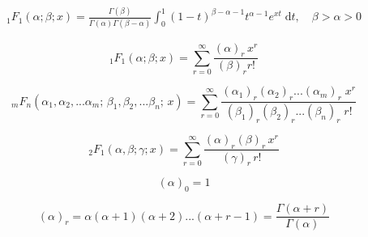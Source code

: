 \[\begin{align} \label{thrm9.7} {}_1F_1(\alpha ; \beta ; x) = \frac{\Gamma(\beta)}{\Gamma(\alpha)\Gamma(\beta-\alpha)}\int_0^1(1-t)^{\beta-\alpha-1}t^{\alpha-1}e^{xt}\; \mathrm dt,\quad \beta>\alpha>0 \end{align}\]

\[\begin{equation} \label{confhypergeo} _1F_1(\alpha;\beta;x) = \sum_{r=0}^\infty\frac{(\alpha)_r\,x^r}{(\beta)_rr!} \end{equation}\]

\[\begin{equation} \label{hypergeodef} _{m}F_{n}(\alpha_1,\alpha_2,...\alpha_m;\, \beta_1,\beta_2,...\beta_n;\, x)=\sum _{r=0}^\infty \frac {(\alpha_1)_r(\alpha_2)_r...(\alpha_m)_r\;x^r}{(\beta_1)_r(\beta_2)_r...(\beta_n)_r\;r!} \end{equation}\]

\[\begin{equation} \label{simplehypergeo} _2F_1(\alpha,\beta;\gamma;x)=\sum _{r=0}^{\infty }\frac {(\alpha)_{r}(\beta)_{r}\,x^r}{(\gamma)_r\,r!} \end{equation}\]

\[\begin{equation} \label{poch0} (\alpha)_0 = 1 \end{equation}\]

\[\begin{equation} \label{pochhammer} (\alpha)_r=\alpha(\alpha+1)(\alpha+2) ... (\alpha+r-1) = \frac{\Gamma(\alpha + r)}{\Gamma(\alpha)} \end{equation}\]
